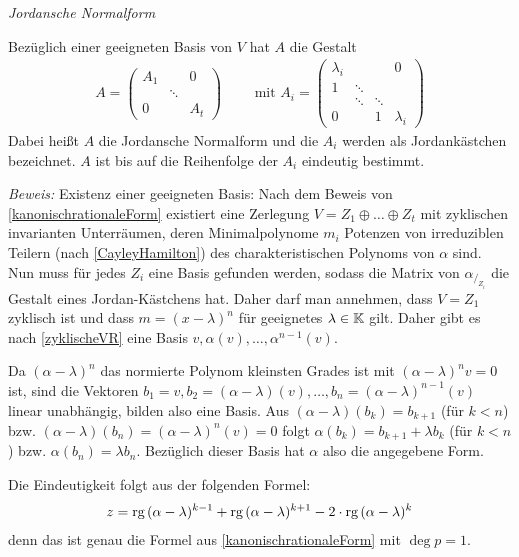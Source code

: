 \begin{mysatz}\label{jordanscheNormalform} \textit{Jordansche Normalform}

    Bezüglich einer geeigneten Basis von $V$ hat $A$ die Gestalt
    \begin{align*}
        A =
        \begin{pmatrix}
            A_1 & & 0\\
             & \ddots & \\
             0 & & A_t
        \end{pmatrix}
        \qquad \text{ mit } A_i =
        \begin{pmatrix}
            \lambda_i & & & 0\\
            1 & \ddots & & \\
            & \ddots & \ddots & \\
            0 & & 1 & \lambda_i
        \end{pmatrix}
    \end{align*}
    Dabei heißt $A$ die Jordansche Normalform und die $A_i$ werden als Jordankästchen bezeichnet.
    $A$ ist bis auf die Reihenfolge der $A_i$ eindeutig bestimmt.

\textit{Beweis:}
    Existenz einer geeigneten Basis:
    Nach dem Beweis von \ref{kanonischrationaleForm} existiert eine Zerlegung $V = Z_1 \oplus \ldots \oplus Z_t$ mit zyklischen invarianten Unterräumen,
    deren Minimalpolynome $m_i$ Potenzen von irreduziblen Teilern (nach \ref{CayleyHamilton}) des charakteristischen Polynoms von $\alpha$ sind.
    Nun muss für jedes $Z_i$ eine Basis gefunden werden, sodass die Matrix von $\alpha_{/_{Z_i}}$ die Gestalt eines Jordan-Kästchens hat.
    Daher darf man annehmen, dass $V = Z_1$ zyklisch ist und dass $m = (x - \lambda)^n$ für geeignetes $\lambda \in \mathbb{K}$ gilt.
    Daher gibt es nach \ref{zyklischeVR} eine Basis $v,\alpha(v),\ldots,\alpha^{n-1}(v)$.

    Da $(\alpha - \lambda)^n$ das normierte Polynom kleinsten Grades ist mit $(\alpha - \lambda)^n v = 0$ ist,
    sind die Vektoren $b_1 = v, b_2 = (\alpha - \lambda)(v),\ldots,b_n = (\alpha - \lambda)^{n-1}(v)$ linear unabhängig, bilden also eine Basis.
    Aus $(\alpha - \lambda)(b_k) = b_{k+1}$ (für $k < n$) bzw. $(\alpha - \lambda)(b_n) = (\alpha - \lambda)^n(v) = 0$ folgt
    $\alpha(b_k) = b_{k+1} + \lambda b_k$ (für $k<n$) bzw. $\alpha(b_n)= \lambda b_n$. Bezüglich dieser Basis hat $\alpha$ also die angegebene Form.

    Die Eindeutigkeit folgt aus der folgenden Formel:
    \begin{align*}
        z = \text{rg}\, (\alpha-\lambda)^{k-1} + \text{rg}\, (\alpha-\lambda)^{k+1} - 2\cdot \text{rg}\, (\alpha-\lambda)^{k}
    \end{align*}
    denn das ist genau die Formel aus \ref{kanonischrationaleForm} mit $\deg p=1$.
\end{mysatz}


